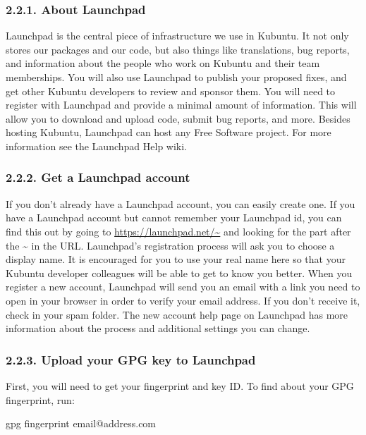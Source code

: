 \documentclass[letterpaper,10pt,english]{sphinxmanual}
\begin{document}
\subsubsection{2.2.1. About Launchpad}
\label{\detokenize{docs/packaging_guide/getting_started:about-launchpad}}
Launchpad is the central piece of infrastructure we use in Kubuntu. It not only stores our packages and our code, but also things like translations, bug reports, and information about the people who work on Kubuntu and their team memberships. You will also use Launchpad to publish your proposed fixes, and get other Kubuntu developers to review and sponsor them.
You will need to register with Launchpad and provide a minimal amount of information. This will allow you to download and upload code, submit bug reports, and more.
Besides hosting Kubuntu, Launchpad can host any Free Software project. For more information see the Launchpad Help wiki.


\subsubsection{2.2.2. Get a Launchpad account}
\label{\detokenize{docs/packaging_guide/getting_started:get-a-launchpad-account}}
If you don’t already have a Launchpad account, you can easily create one. If you have a Launchpad account but cannot remember your Launchpad id, you can find this out by going to \url{https://launchpad.net/~} and looking for the part after the \textasciitilde{} in the URL.
Launchpad’s registration process will ask you to choose a display name. It is encouraged for you to use your real name here so that your Kubuntu developer colleagues will be able to get to know you better.
When you register a new account, Launchpad will send you an email with a link you need to open in your browser in order to verify your email address. If you don’t receive it, check in your spam folder.
The new account help page on Launchpad has more information about the process and additional settings you can change.


\subsubsection{2.2.3. Upload your GPG key to Launchpad}
\label{\detokenize{docs/packaging_guide/getting_started:upload-your-gpg-key-to-launchpad}}
First, you will need to get your fingerprint and key ID.
To find about your GPG fingerprint, run:

\begin{sphinxVerbatim}[commandchars=\\\{\}]
\PYGZdl{} gpg \PYGZhy{}\PYGZhy{}fingerprint email@address.com
\end{sphinxVerbatim}
\end{document}

